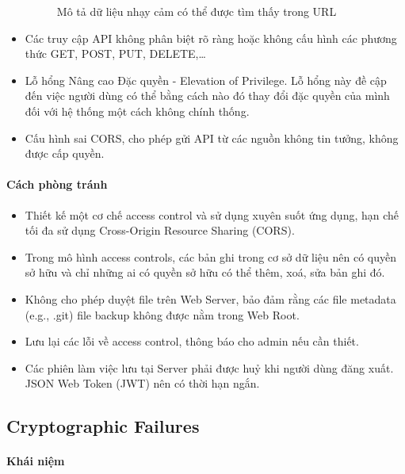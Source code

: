 \begin{itemize}
\begin{figure}[H]
        \caption{Mô tả dữ liệu nhạy cảm có thể được tìm thấy trong URL ~\cite{chap2bib3}}
        \label{fib:DuLieuNhayCam}
    \end{figure}
    \item Các truy cập API không phân biệt rõ ràng hoặc không cấu hình các phương thức GET, POST, PUT, DELETE,…
    \item Lỗ hổng Nâng cao Đặc quyền - Elevation of Privilege. Lỗ hổng này đề cập đến việc người dùng có thể bằng cách nào đó thay đổi đặc quyền của mình đối với hệ thống một cách không chính thống.
    \item Cấu hình sai CORS, cho phép gửi API từ các nguồn không tin tưởng, không được cấp quyền.
\end{itemize}

\paragraph{Cách phòng tránh}

\begin{itemize}
    \item Thiết kế một cơ chế access control và sử dụng xuyên suốt ứng dụng, hạn chế tối đa sử dụng Cross-Origin Resource Sharing (CORS).
    \item Trong mô hình access controls, các bản ghi trong cơ sở dữ liệu nên có quyền sở hữu và chỉ những ai có quyền sở hữu có thể thêm, xoá, sửa bản ghi đó.
    \item Không cho phép duyệt file trên Web Server, bảo đảm rằng các file metadata (e.g., .git) file backup không được nằm trong Web Root.
    \item Lưu lại các lỗi về access control, thông báo cho admin nếu cần thiết.
    \item Các phiên làm việc lưu tại Server phải được huỷ khi người dùng đăng xuất. JSON Web Token (JWT) nên có thời hạn ngắn.
\end{itemize}

\subsection{Cryptographic Failures ~\cite{chap2bib7}}

\paragraph{Khái niệm ~\cite{chap2bib8}}

